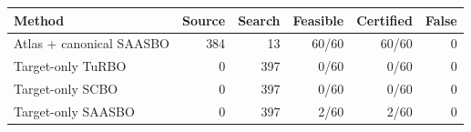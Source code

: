 \begin{tabular}{lrrrrr}
\toprule
Method & Source & Search & Feasible & Certified & False \\
\midrule
Atlas + canonical SAASBO & 384 & 13 & 60/60 & 60/60 & 0 \\
Target-only TuRBO & 0 & 397 & 0/60 & 0/60 & 0 \\
Target-only SCBO & 0 & 397 & 0/60 & 0/60 & 0 \\
Target-only SAASBO & 0 & 397 & 2/60 & 2/60 & 0 \\
\bottomrule
\end{tabular}
